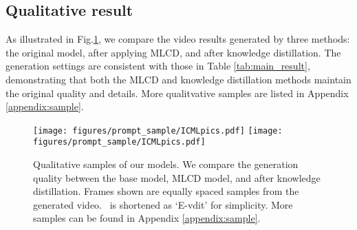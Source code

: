 \subsection{Qualitative result}
\label{sec:visual}
As illustrated in Fig.\ref{fig:vis}, we compare the video results generated by three methods: the original model, after applying MLCD, and after knowledge distillation. The generation settings are consistent with those in Table \ref{tab:main_result}, demonstrating that both the MLCD and knowledge distillation methods maintain the original quality and details. More qualitvative samples are listed in Appendix \ref{appendix:sample}.

\begin{figure}[h]
  \centering
  \texttt{[image: figures/prompt\_sample/ICMLpics.pdf]}
  \vskip 5pt
  \texttt{[image: figures/prompt\_sample/ICMLpics.pdf]}
  \caption{Qualitative samples of our models. We compare the generation quality between the base model, MLCD model, and after knowledge distillation. Frames shown are equally spaced samples from the generated video. \methodname~is shortened as `E-vdit' for simplicity. More samples can be found in Appendix \ref{appendix:sample}.}
  \label{fig:vis}
  \vspace{-5mm}
\end{figure}